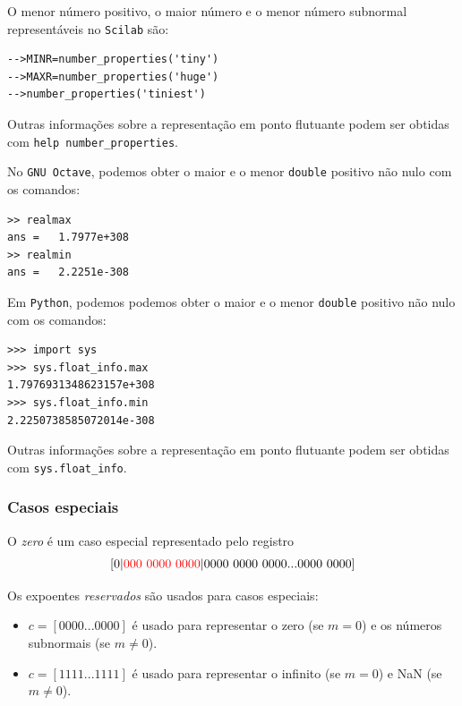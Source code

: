 \ifisscilab
\begin{obs}
  O menor número positivo, o maior número e o menor número subnormal representáveis  no \verb+Scilab+ são:
\begin{verbatim}
-->MINR=number_properties('tiny')
-->MAXR=number_properties('huge')
-->number_properties('tiniest')
\end{verbatim}
Outras informações sobre a representação em ponto flutuante podem ser obtidas com \verb+help number_properties+.
\end{obs}
\fi
\ifisoctave
\begin{obs}
  No \verb+GNU Octave+, podemos obter o maior e o menor \verb+double+ positivo não nulo com os comandos:
\begin{verbatim}
>> realmax
ans =   1.7977e+308
>> realmin
ans =   2.2251e-308
\end{verbatim}
\end{obs}
\fi
\ifispython
\begin{obs}
  Em \verb+Python+, podemos podemos obter o maior e o menor \verb+double+ positivo não nulo com os comandos:
\begin{verbatim}
>>> import sys
>>> sys.float_info.max
1.7976931348623157e+308                 
>>> sys.float_info.min
2.2250738585072014e-308         
\end{verbatim}
Outras informações sobre a representação em ponto flutuante podem ser obtidas com \verb+sys.float_info+.
\end{obs}
\fi

\subsubsection{Casos especiais}
O \emph{zero} é um caso especial representado pelo registro 
$$
[0|{\color{red}{000~0000~0000}} |0000~0000~0000...0000~0000]
$$

Os expoentes \emph{reservados} são usados para casos especiais:
\begin{itemize}
 \item $c=[0000...0000]$ é usado para representar o zero (se $m=0$) e os números subnormais (se $m\neq 0$).
 \item $c=[1111...1111]$ é usado para representar o infinito (se $m=0$) e NaN (se $m\neq 0$).
\end{itemize}

